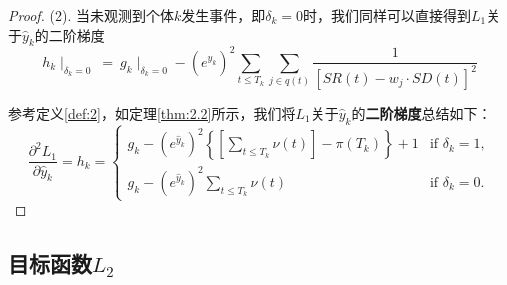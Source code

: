 \begin{proof}
(2). 当未观测到个体$k$发生事件，即$\delta_k=0$时，我们同样可以直接得到$L_1$关于$\hat{y}_k$的二阶梯度$$
h_k\mid_{\delta_k=0}\ =\ g_k\mid_{\delta_k=0} - (e^{\hat{y}_k})^2 \sum_{t\le T_k} \sum_{j\in q(t)} \frac{1}{[SR(t) - w_j\cdot SD(t)]^2}
$$

参考定义\ref{def:2}，如定理\ref{thm:2.2}所示，我们将$L_1$关于$\hat{y}_k$的\textbf{二阶梯度}总结如下：$$
\frac{\partial^2 L_1}{\partial \hat{y}_k} = h_k = 
\begin{cases}
g_k - (e^{\hat{y}_k})^2 \left\{ \left[\sum_{t\le T_k} \nu(t)\right] - \pi(T_k) \right\} + 1 & \text{if } \delta_k = 1,\\
g_k - (e^{\hat{y}_k})^2 \sum_{t\le T_k} \nu(t) & \text{if } \delta_k = 0.
\end{cases}
$$
\end{proof}

\subsection{目标函数$L_2$}

